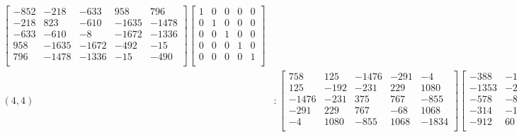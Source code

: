 \documentclass[12pt]{amsart}
\theoremstyle{plain}
\theoremstyle{definition}
\begin{document}
\begin{landscape}
\begin{align*}
\begin{bmatrix}
-852  &   -218  &   -633  &   958  &   796  \\ 
 -218  &   823  &   -610  &   -1635  &   -1478  \\ 
 -633  &   -610  &   -8  &   -1672  &   -1336  \\ 
 958  &   -1635  &   -1672  &   -492  &   -15  \\ 
 796  &   -1478  &   -1336  &   -15  &   -490  \\ 
\end{bmatrix}
\begin{bmatrix}
1  &   0  &   0  &   0  &   0  \\ 
 0  &   1  &   0  &   0  &   0  \\ 
 0  &   0  &   1  &   0  &   0  \\ 
 0  &   0  &   0  &   1  &   0  \\ 
 0  &   0  &   0  &   0  &   1  \\ 
\end{bmatrix}
\\
(4,4) &:
\begin{bmatrix}
758  &   125  &   -1476  &   -291  &   -4  \\ 
 125  &   -192  &   -231  &   229  &   1080  \\ 
 -1476  &   -231  &   375  &   767  &   -855  \\ 
 -291  &   229  &   767  &   -68  &   1068  \\ 
 -4  &   1080  &   -855  &   1068  &   -1834  \\ 
\end{bmatrix}
\begin{bmatrix}
-388  &   -1353  &   -578  &   -314  &   -912  \\ 
 -1353  &   -2163  &   -869  &   -193  &   60  \\ 
 -578  &   -869  &   2664  &   -910  &   1022  \\ 
 -314  &   -193  &   -910  &   1110  &   1171  \\ 
 -912  &   60  &   1022  &   1171  &   -852  \\ 
\end{bmatrix}
\begin{bmatrix}
436  &   241  &   372  &   -1118  &   -485  \\ 
 241  &   -831  &   -1076  &   872  &   566  \\ 
 372  &   -1076  &   709  &   -781  &   -69  \\ 
 -1118  &   872  &   -781  &   239  &   -903  \\ 
 -485  &   566  &   -69  &   -903  &   -1500  \\ 

\end{bmatrix}
\end{align*}
\end{landscape}
\end{document}
